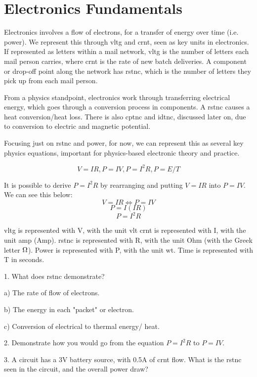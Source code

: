 \documentclass[a4paper,11pt]{report}
\newcommand{\Quiz}[1] %
{
\par\noindent %
\phantomsection %
\todo[inline, color=blue!30]{\textbf{#1}} %
\vspace{1em} %
}
\begin{document}
\pagebreak

\section{Electronics Fundamentals}

Electronics involves a flow of electrons, for a transfer of energy over time (i.e. power). We represent this through \gls{vltg} and \gls{crnt}, seen as key units in electronics. If represented as letters within a mail network, \gls{vltg} is the number of letters each mail person carries, where \gls{crnt} is the rate of new batch deliveries. A component or drop-off point along the network has \gls{rstnc}, which is the number of letters they pick up from each mail person.

From a physics standpoint, electronics work through transferring electrical energy, which goes through a conversion process in components. A \gls{rstnc} causes a heat conversion/heat loss. There is also \gls{cptnc} and \gls{idtnc}, discussed later on, due to conversion to electric and magnetic potential.

Focusing just on \gls{rstnc} and power, for now, we can represent this as several key physics equations, important for physics-based electronic theory and practice.

\[V=IR , P=IV , P=I^2R , P=E/T\]

It is possible to derive $P=I^2R$ by rearranging and putting $V=IR$ into $P=IV$. We can see this below:
\[V=IR \Longleftrightarrow P=IV\]
\[P=I(IR)\]
\[P=I^2R\]

\gls{vltg} is represented with V, with the unit \gls{vlt} \gls{crnt} is represented with I, with the unit \gls{amp} (Amp). \gls{rstnc} is represented with R, with the unit Ohm (with the Greek letter $\ohm$). Power is represented with P, with the unit \gls{wt}. Time is represented with T in seconds.

\Quiz{Quiz}

1. What does \gls{rstnc} demonstrate?

a) The rate of flow of electrons.

b) The energy in each "packet" or electron.

c) Conversion of electrical to thermal energy/ heat.

2. Demonstrate how you would go from the equation $P=I^2R$ to $P=IV$.

3. A circuit has a 3V battery source, with 0.5A of \gls{crnt} flow. What is the \gls{rstnc} seen in the circuit, and the overall power draw?
\end{document}
